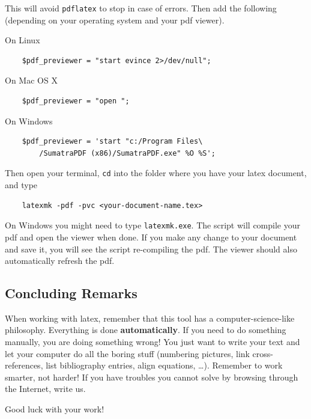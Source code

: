 This will avoid \texttt{pdflatex} to stop in case of errors.
Then add the following (depending on your operating system and your pdf viewer).

On Linux

{\footnotesize
\begin{verbatim}
	$pdf_previewer = "start evince 2>/dev/null";
\end{verbatim}
}
On Mac OS X

{\footnotesize
\begin{verbatim}
	$pdf_previewer = "open ";
\end{verbatim}
}
On Windows

{\footnotesize
\begin{verbatim}
	$pdf_previewer = 'start "c:/Program Files\
	    /SumatraPDF (x86)/SumatraPDF.exe" %O %S';
\end{verbatim}
}

Then open your terminal, \verb|cd| into the folder where you have your latex document, and type

{\footnotesize
\begin{verbatim}
	latexmk -pdf -pvc <your-document-name.tex>
\end{verbatim}
}

On Windows you might need to type \verb|latexmk.exe|.
The script will compile your pdf and open the viewer when done.
If you make any change to your document and save it, you will see the script re-compiling the pdf.
The viewer should also automatically refresh the pdf.

\subsection{Concluding Remarks}

When working with latex, remember that this tool has a computer-science-like philosophy.
Everything is done \textbf{automatically}.
If you need to do something manually, you are doing something wrong!
You just want to write your text and let your computer do all the boring stuff (numbering pictures, link cross-references, list bibliography entries, align equations, \dots).
Remember to work smarter, not harder!
If you have troubles you cannot solve by browsing through the Internet, write us.

Good luck with your work!
